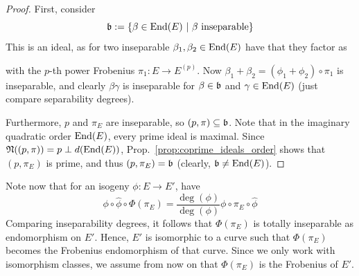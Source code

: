\begin{proof}
    First, consider
    \begin{equation*}
        \mathfrak{b} := \{ \beta \in \mathrm{End}(E) \ | \ \text{$\beta$ inseparable} \}
    \end{equation*}
    This is an ideal, as for two inseparable $\beta_1, \beta_2 \in \mathrm{End}(E)$ have that they factor as
    \begin{center}
    \end{center}
    with the $p$-th power Frobenius $\pi_1: E \to E^{(p)}$.
    Now $\beta_1 + \beta_2 = (\phi_1 + \phi_2) \circ \pi_1$ is inseparable, and clearly $\beta \gamma$ is inseparable for $\beta \in \mathfrak{b}$ and $\gamma \in \mathrm{End}(E)$ (just compare separability degrees).

    Furthermore, $p$ and $\pi_E$ are inseparable, so $(p, \pi) \subseteq \mathfrak{b}$.
    Note that in the imaginary quadratic order $\mathrm{End}(E)$, every prime ideal is maximal.
    Since $\mathfrak{N}((p, \pi)) = p \perp d(\mathrm{End}(E))$, Prop.~\ref{prop:coprime_ideals_order} shows that $(p, \pi_E)$ is prime, and thus $(p, \pi_E) = \mathfrak{b}$ (clearly, $\mathfrak{b} \neq \mathrm{End}(E)$).
\end{proof}
Note now that for an isogeny $\phi: E \to E'$, have
\begin{equation*}
    \phi \circ \hat{\phi} \circ \Phi(\pi_E) = \frac {\deg(\phi)} {\deg(\phi)} \phi \circ \pi_E \circ \hat{\phi}
\end{equation*}
Comparing inseparability degrees, it follows that $\Phi(\pi_E)$ is totally inseparable as endomorphism on $E'$.
Hence, $E'$ is isomorphic to a curve such that $\Phi(\pi_E)$ becomes the Frobenius endomorphism of that curve.
Since we only work with isomorphism classes, we assume from now on that $\Phi(\pi_E)$ is the Frobenius of $E'$.

